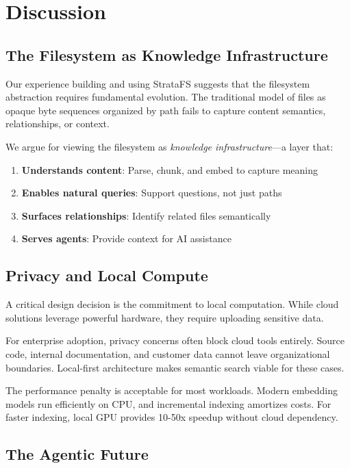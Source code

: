\documentclass[conference]{IEEEtran}
\begin{document}
\section{Discussion}

\subsection{The Filesystem as Knowledge Infrastructure}

Our experience building and using StrataFS suggests that the filesystem abstraction requires fundamental evolution. The traditional model of files as opaque byte sequences organized by path fails to capture content semantics, relationships, or context.

We argue for viewing the filesystem as \textit{knowledge infrastructure}---a layer that:

\begin{enumerate}
    \item \textbf{Understands content}: Parse, chunk, and embed to capture meaning
    \item \textbf{Enables natural queries}: Support questions, not just paths
    \item \textbf{Surfaces relationships}: Identify related files semantically
    \item \textbf{Serves agents}: Provide context for AI assistance
\end{enumerate}

\subsection{Privacy and Local Compute}

A critical design decision is the commitment to local computation. While cloud solutions leverage powerful hardware, they require uploading sensitive data.

For enterprise adoption, privacy concerns often block cloud tools entirely. Source code, internal documentation, and customer data cannot leave organizational boundaries. Local-first architecture makes semantic search viable for these cases.

The performance penalty is acceptable for most workloads. Modern embedding models run efficiently on CPU, and incremental indexing amortizes costs. For faster indexing, local GPU provides 10-50x speedup without cloud dependency.

\subsection{The Agentic Future}
\end{document}

